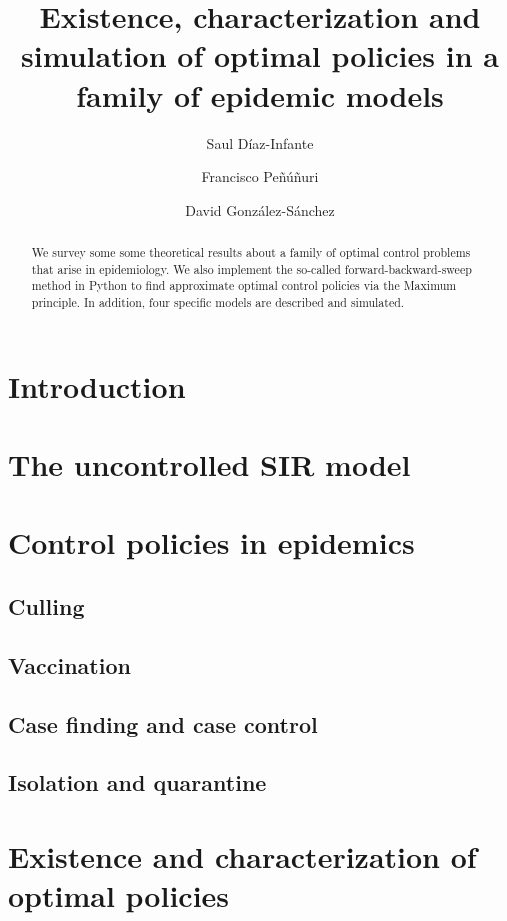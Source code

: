 \documentclass[]{amsart}
\title[%
	Existence, characterization and simulation of optimal policies in a family of epidemic 
	models%
	]{
	Existence, characterization and simulation of optimal policies in a family of epidemic 
  models
}
\author[S. D\'iaz-Infante]{Saul D\'iaz-Infante}
\author[F. Pe\~nu\~n\'{u}ri]{Francisco Pe\~n\'u\~nuri}
\author[D. Gonz\'alez-S\'anchez]{David Gonz\'alez-S\'anchez}
\begin{document}
\maketitle	
  \begin{abstract}
  	We survey some some theoretical results about a family of optimal control problems that arise in epidemiology. We also implement the so-called forward-backward-sweep method in Python to find approximate optimal control policies via the Maximum principle. In addition, four specific models are described and simulated.  
  \end{abstract}
  
%

  \section{Introduction}
    
  \section{The uncontrolled SIR model}
    
  \section{Control policies in epidemics}
    
    \subsection{Culling}
      
    \subsection{Vaccination}
      
    \subsection{Case finding and case control}
      
    \subsection{Isolation and quarantine}
      
%
  \section{Existence and characterization of optimal policies}
    
%
%
\end{document}
